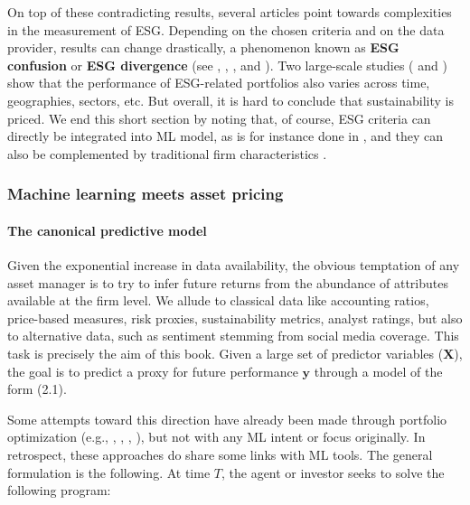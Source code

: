 On top of these contradicting results, several articles point towards complexities in the measurement of ESG. Depending on the chosen criteria and on the data provider, results can change drastically, a phenomenon known as \textbf{ESG confusion} or \textbf{ESG divergence} (see \cite{galema2008stocks}, \cite{atta2020strategies}, \cite{dimson2020divergent}, \cite{avramov2022sustainable} and \cite{berg2019aggregate}). Two large-scale studies (\cite{beyer2024non} and \cite{alves2025drawing}) show that the performance of ESG-related portfolios also varies across time, geographies, sectors, etc. But overall, it is hard to conclude that sustainability is priced. We end this short section by noting that, of course, ESG criteria can directly be integrated into ML model, as is for instance done in \cite{de2020esg}, and they can also be complemented by traditional firm characteristics \citep{coqueret2022enhancing}.

\subsubsection{Machine learning meets asset pricing}

\paragraph{The canonical predictive model}

Given the exponential increase in data availability, the obvious temptation of any asset manager is to try to infer future returns from the abundance of attributes available at the firm level. We allude to classical data like accounting ratios, price-based measures, risk proxies, sustainability metrics, analyst ratings, but also to alternative data, such as sentiment stemming from social media coverage. This task is precisely the aim of this book. Given a large set of predictor variables ($\mathbf{X}$), the goal is to predict a proxy for future performance $\mathbf{y}$ through a model of the form (2.1).

Some attempts toward this direction have already been made through portfolio optimization (e.g., \cite{brandt2009parametric}, \cite{hjalmarsson2012characteristic}, \cite{ammann2016characteristics}, \cite{martin2018transaction}), but not with any ML intent or focus originally. In retrospect, these approaches do share some links with ML tools. The general formulation is the following. At time\newline
$T$, the agent or investor seeks to solve the following program:

